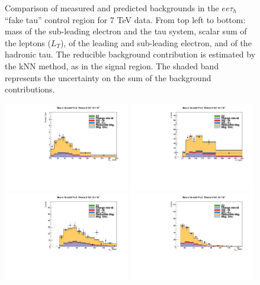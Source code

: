 \begin{figure}
\begin{center}
  \caption{Comparison of measured and predicted backgrounds in the $ee\tau_h$ ``fake tau'' control region for 7 TeV data.
  From top left to bottom: mass of the sub-leading electron and the tau system, scalar sum of the leptons \pT ($L_T$), \pT of the leading and sub-leading electron, and \pT of the hadronic tau.
  The reducible background contribution is estimated by the kNN method, as in the signal region.
  The shaded band represents the uncertainty on the sum of the background contributions.
  }
  \label{fig:LLT_eet_f3_control_7TeV}
\end{center}
\end{figure}

\begin{figure}
\begin{center}
  \includegraphics[width=0.49\textwidth]{4_Analisys/pics/8TeV/plots/eet/f3/Full/final-f3-subMass-Full.pdf}
  \includegraphics[width=0.49\textwidth]{4_Analisys/pics/8TeV/plots/eet/f3/final-f3-LT.pdf}\\
  \includegraphics[width=0.49\textwidth]{4_Analisys/pics/8TeV/plots/eet/f3/Full/final-f3-e1Pt-Full.pdf}
  \includegraphics[width=0.49\textwidth]{4_Analisys/pics/8TeV/plots/eet/f3/Full/final-f3-e2Pt-Full.pdf}\\

\end{center}
\end{figure}
